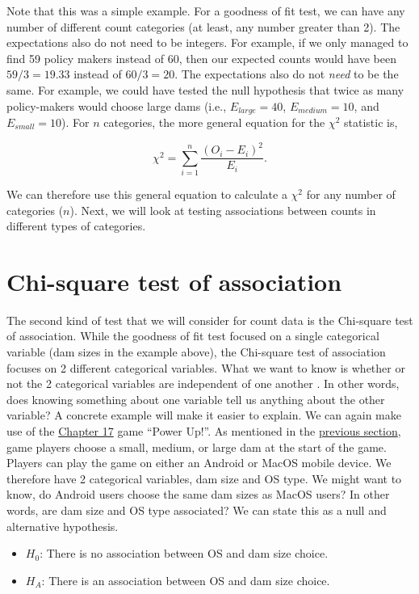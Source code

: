 \documentclass[
  openany]{krantz}
\providecommand{\tightlist}{%
  \setlength{\itemsep}{0pt}\setlength{\parskip}{0pt}}
\begin{document}
Note that this was a simple example.
For a goodness of fit test, we can have any number of different count categories (at least, any number greater than 2).
The expectations also do not need to be integers.
For example, if we only managed to find 59 policy makers instead of 60, then our expected counts would have been \(59/3 = 19.33\) instead of \(60/3 = 20\).
The expectations also do not \emph{need} to be the same.
For example, we could have tested the null hypothesis that twice as many policy-makers would choose large dams (i.e., \(E_{large} = 40\), \(E_{medium} = 10\), and \(E_{small} = 10\)).
For \(n\) categories, the more general equation for the \(\chi^{2}\) statistic is,

\[\chi^{2} = \sum_{i = 1}^{n} \frac{\left(O_{i} - E_{i}\right)^{2}}{E_{i}}.\]

We can therefore use this general equation to calculate a \(\chi^{2}\) for any number of categories (\(n\)).
Next, we will look at testing associations between counts in different types of categories.

\hypertarget{chi-square-test-of-association}{%
\section{Chi-square test of association}\label{chi-square-test-of-association}}

The second kind of test that we will consider for count data is the Chi-square test of association.
While the goodness of fit test focused on a single categorical variable (dam sizes in the example above), the Chi-square test of association focuses on 2 different categorical variables.
What we want to know is whether or not the 2 categorical variables are independent of one another \citep{Box1978}.
In other words, does knowing something about one variable tell us anything about the other variable?
A concrete example will make it easier to explain.
We can again make use of the \protect\hyperlink{Chapter_17}{Chapter 17} game ``Power Up!''.
As mentioned in the \protect\hyperlink{chi-squared-goodness-of-fit}{previous section}, game players choose a small, medium, or large dam at the start of the game.
Players can play the game on either an Android or MacOS mobile device.
We therefore have 2 categorical variables, dam size and OS type.
We might want to know, do Android users choose the same dam sizes as MacOS users?
In other words, are dam size and OS type associated?
We can state this as a null and alternative hypothesis.

\begin{itemize}
\tightlist
\item
  \(H_{0}\): There is no association between OS and dam size choice.
\item
  \(H_{A}\): There is an association between OS and dam size choice.
\end{itemize}
\end{document}

